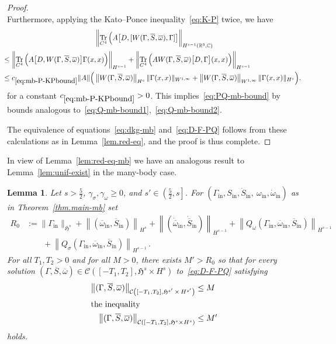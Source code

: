\documentclass[10pt]{amsart}
\newtheorem{lemm}[theo]{Lemma}\newtheorem{prop}[theo]{Proposition}\newtheorem{coro}[theo]{Corollary}\newtheorem{conj}[theo]{Conjecture}
\theoremstyle{definition}\newtheorem{defi}[theo]{Definition}\newtheorem{rema}[theo]{Remark}\newtheorem{exam}[theo]{Example}\newtheorem{exem}[theo]{Example}\newtheorem{nota}[theo]{Notation}
\DeclareMathOperator{\tr}{Tr}
\newcommand{\rmin}{\mathrm{in}}
\newcommand{\cC}{\mathcal{C}}
\newcommand\R{\mathbb{R}}
\newcommand\C{\mathbb{C}}
\newcommand{\gH}{\mathfrak{H}}
\begin{document}
\begin{proof}
\begin{equation}
\end{equation}
Furthermore, applying the Kato--Ponce inequality~\eqref{eq:K-P} twice, we have
\begin{multline}\label{eq:mb-P-KPbound}
\left\|\tr_{C^4}\Big(A\big[D,[W(\Gamma, \overline{S}, \overline{\omega}), \Gamma]\big]\right\|_{H^{s-1}(\R^3,\C)}\\
\mkern-14mu{\begin{aligned}
&\leq \left\|\tr_{C^4}\Big(A\big[D,W(\Gamma, \overline{S}, \overline{\omega})\big] \Gamma(x,x)\Big)\right\|_{H^{s-1}} + \left\|\tr_{C^4}\Big(A W(\Gamma, \overline{S}, \overline{\omega})\big[D,\Gamma\big] (x,x)\Big)\right\|_{H^{s-1}}\\
&\leq c_{\eqref{eq:mb-P-KPbound}} \|A\|\Big(\left\|W(\Gamma, \overline{S}, \overline{\omega})\right\|_{H^{s}} \|\Gamma(x,x)\|_{W^{1,\infty}} + \left\|W(\Gamma, \overline{S}, \overline{\omega})\right\|_{W^{1, \infty}} \|\Gamma(x,x)\|_{H^{s}} \Big).
\end{aligned}}
\end{multline}
for a constant $c_{\eqref{eq:mb-P-KPbound}}>0$. This implies~\eqref{eq:PQ-mb-bound} by bounds analogous to~\eqref{eq:Q-mb-bound1},~\eqref{eq:Q-mb-bound2}.

The equivalence of equations~\eqref{eq:dkg-mb} and~\eqref{eq:D-F-PQ} follows from these calculations as in Lemma~\ref{lem.red-eq}, and the proof is thus complete.
\end{proof}

In view of Lemma~\ref{lem:red-eq-mb} we have an analogous result to Lemma~\ref{lem:unif-exist} in the many-body case.

\begin{lemm}\label{lem:unif-exist-mb}
Let $s>\tfrac52$, $\gamma_\sigma, \gamma_\omega\geq 0$, and $s'\in\left(\tfrac52,s\right]$. For $(\Gamma_\rmin, S_\rmin, \dot S_\rmin, \ \omega_\rmin, \dot \omega_\rmin)$ as in Theorem~\ref{thm.main-mb} set
\begin{align*}
R_0&:= \|\Gamma_\rmin\|_{\gH^s} +\left\|(\overline{\omega}_\rmin, \overline{S}_\rmin)\right\|_{H^s} + \left\|(\dot{\overline{\omega}}_\rmin, \dot{\overline{S}}_\rmin)\right\|_{H^{s-1}} +\left\|Q_\omega(\Gamma_\rmin, \overline{\omega}_\rmin, \overline{S}_\rmin)\right\|_{H^{s-1}}\\
&\qquad+ \left\|Q_\sigma(\Gamma_\rmin, \overline{\omega}_\rmin, \overline{S}_\rmin)\right\|_{H^{s-1}}\,.
\end{align*}
For all $T_1,T_2>0$ and for all $M>0$, there exists $M'>R_0$ so that for every solution $(\Gamma, \overline{S},\overline{\omega})\in \cC([-T_1, T_2],\gH^s \times H^s)$ to~\eqref{eq:D-F-PQ} satisfying
\begin{align}
\left\| (\Gamma, \overline{S}, \overline{\omega}) \right\|_{\cC\left([-T_1, T_2],\gH^{s'}\,\times\, H^{s'}\right)} &\leq M
\nonumber\\
\intertext{the inequality}
\left\|(\Gamma, \overline{S}, \overline{\omega})\right\|_{\cC\left([-T_1, T_2],\gH^s\times H^s\right)} &\leq M'\label{pt2-unif-mb}
\end{align}
holds.
\end{lemm}
\end{document}
